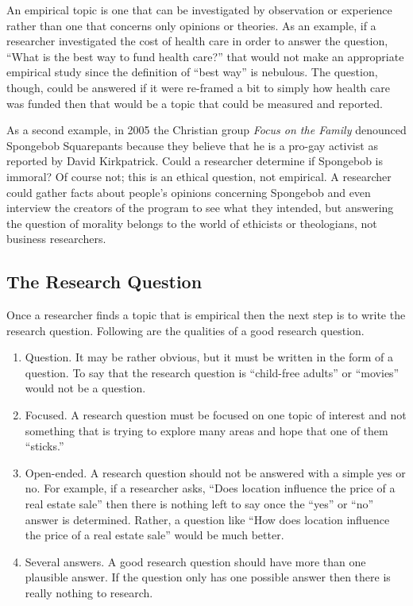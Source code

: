 An empirical topic is one that can be investigated by observation or experience rather than one that concerns only opinions or theories. As an example, if a researcher investigated the cost of health care in order to answer the question, ``What is the best way to fund health care?'' that would not make an appropriate empirical study since the definition of ``best way'' is nebulous. The question, though, could be answered if it were re-framed a bit to simply how health care was funded then that would be a topic that could be measured and reported.

As a second example, in 2005 the Christian group \textit{Focus on the Family} denounced Spongebob Squarepants because they believe that he is a pro-gay activist as reported by David Kirkpatrick\cite{kirkpatrick2005conservatives}. Could a researcher determine if Spongebob is immoral? Of course not; this is an ethical question, not empirical. A researcher could gather facts about people's opinions concerning Spongebob and even interview the creators of the program to see what they intended, but answering the question of morality belongs to the world of ethicists or theologians, not business researchers.

\subsection{The Research Question}

Once a researcher finds a topic that is empirical then the next step is to write the research question. Following are the qualities of a good research question.

\begin{enumerate}
	\item Question. It may be rather obvious, but it must be written in the form of a question. To say that the research question is ``child-free adults'' or ``movies'' would not be a question. 
	\item Focused. A research question must be focused on one topic of interest and not something that is trying to explore many areas and hope that one of them ``sticks.''
	\item Open-ended. A research question should not be answered with a simple yes or no. For example, if a researcher asks, ``Does location influence the price of a real estate sale'' then there is nothing left to say once the ``yes'' or ``no'' answer is determined. Rather, a question like ``How does location influence the price of a real estate sale'' would be much better.
	\item Several answers. A good research question should have more than one plausible answer. If the question only has one possible answer then there is really nothing to research.
\end{enumerate}

